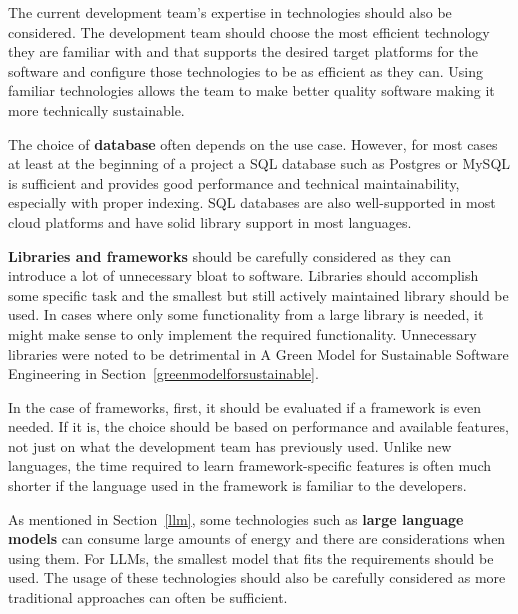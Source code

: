 The current development team's expertise in technologies should also be considered. The development team should choose the most efficient technology they are familiar with and that supports the desired target platforms for the software and configure those technologies to be as efficient as they can. Using familiar technologies allows the team to make better quality software making it more technically sustainable.

The choice of \textbf{database} often depends on the use case. However, for most cases at least at the beginning of a project a SQL database such as Postgres or MySQL is sufficient and provides good performance and technical maintainability, especially with proper indexing. SQL databases are also well-supported in most cloud platforms and have solid library support in most languages.

\textbf{Libraries and frameworks} should be carefully considered as they can introduce a lot of unnecessary bloat to software. Libraries should accomplish some specific task and the smallest but still actively maintained library should be used. In cases where only some functionality from a large library is needed, it might make sense to only implement the required functionality. Unnecessary libraries were noted to be detrimental in A Green Model for Sustainable Software Engineering in Section~\ref{greenmodelforsustainable}.

In the case of frameworks, first, it should be evaluated if a framework is even needed. If it is, the choice should be based on performance and available features, not just on what the development team has previously used. Unlike new languages, the time required to learn framework-specific features is often much shorter if the language used in the framework is familiar to the developers.

As mentioned in Section~\ref{llm}, some technologies such as \textbf{large language models} can consume large amounts of energy and there are considerations when using them. For LLMs, the smallest model that fits the requirements should be used. The usage of these technologies should also be carefully considered as more traditional approaches can often be sufficient.

